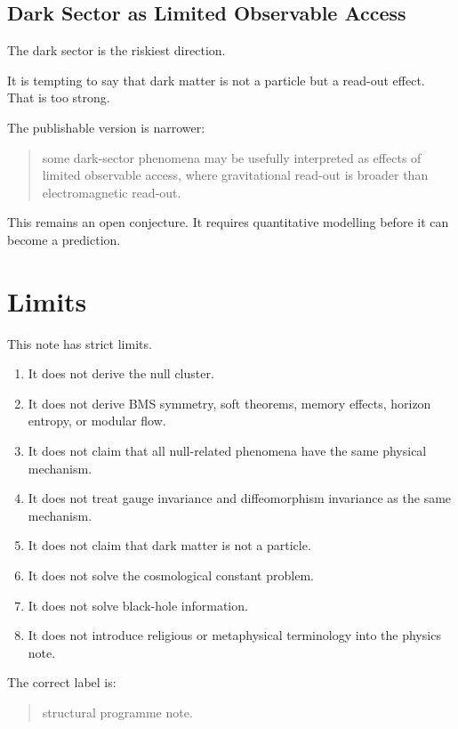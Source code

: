 \documentclass[12pt,a4paper]{article}
\theoremstyle{definition}
\theoremstyle{remark}
\newcommand{\tightlist}{%
  \setlength{\itemsep}{0pt}\setlength{\parskip}{0pt}}
\begin{document}
\subsection{Dark Sector as Limited Observable
Access}\label{dark-sector-as-limited-observable-access}

The dark sector is the riskiest direction.

It is tempting to say that dark matter is not a particle but a read-out
effect. That is too strong.

The publishable version is narrower:

\begin{quote}
some dark-sector phenomena may be usefully interpreted as effects of
limited observable access, where gravitational read-out is broader than
electromagnetic read-out.
\end{quote}

This remains an open conjecture. It requires quantitative modelling
before it can become a prediction.

\section{Limits}\label{limits}

This note has strict limits.

\begin{enumerate}[leftmargin=*]
\tightlist
\item
  It does not derive the null cluster.
\item
  It does not derive BMS symmetry, soft theorems, memory effects,
  horizon entropy, or modular flow.
\item
  It does not claim that all null-related phenomena have the same
  physical mechanism.
\item
  It does not treat gauge invariance and diffeomorphism invariance as
  the same mechanism.
\item
  It does not claim that dark matter is not a particle.
\item
  It does not solve the cosmological constant problem.
\item
  It does not solve black-hole information.
\item
  It does not introduce religious or metaphysical terminology into the
  physics note.
\end{enumerate}

The correct label is:

\begin{quote}
structural programme note.
\end{quote}
\end{document}
